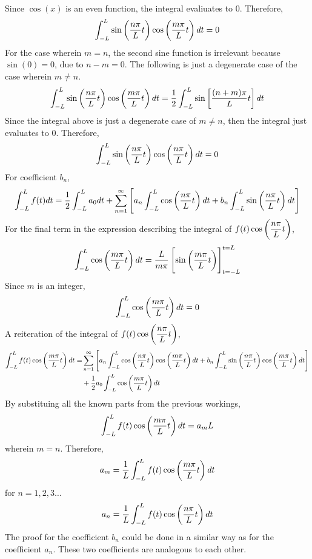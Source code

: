 \documentclass[a4paper, 12pt]{report}
\begin{document}
\begin{center}
\begin{align*}
\end{align*}
Since $\cos(x)$ is an even function, the integral evaliuates to 0. Therefore,
$$\int_{-L}^{L}\sin\left(\frac{n\pi}{L}t\right)\cos\left(\frac{m\pi}{L}t\right)dt = 0$$
For the case wherein $m = n$, the second sine function is irrelevant because $\sin(0) = 0$, due to $n-m=0$. The following is just a degenerate case of the case wherein $m\neq n$.
$$\int_{-L}^{L}\sin\left(\frac{n\pi}{L}t\right)\cos\left(\frac{m\pi}{L}t\right)dt = \frac{1}{2}\int_{-L}^{L}\sin\left[\frac{(n+m)\pi}{L}t\right]dt$$
Since the integral above is just a degenerate case of $m\neq n$, then the integral just evaluates to $0$. Therefore,
$$\int_{-L}^{L}\sin\left(\frac{n\pi}{L}t\right)\cos\left(\frac{n\pi}{L}t\right)dt = 0$$
For coefficient $b_n$,
$$\int_{-L}^{L}f(t)dt = \frac{1}{2} \int_{-L}^{L}a_0dt + \sum_{n = 1}^{\infty}\left[a_n \int_{-L}^{L}\cos\left(\frac{n\pi}{L}t\right)dt + b_n \int_{-L}^{L}\sin\left(\frac{n\pi}{L}t\right)dt\right]$$
For the final term in the expression describing the integral of $\displaystyle{f(t)\cos\left(\frac{n\pi}{L}t\right)}$, 
$$\int_{-L}^{L}\cos\left(\frac{m\pi}{L}t\right)dt = \frac{L}{m\pi}\left[\sin\left(\frac{m\pi}{L}t\right)\right]^{t=L}_{t=-L}$$
Since $m$ is an integer,
$$\int_{-L}^{L}\cos\left(\frac{m\pi}{L}t\right)dt = 0$$
A reiteration of the integral of $\displaystyle{f(t)\cos\left(\frac{n\pi}{L}t\right)}$,
 \begin{align*}
\int_{-L}^{L}f(t)\cos\left(\frac{m\pi}{L}t\right)dt = &\sum_{n = 1}^{\infty}\left[a_n \int_{-L}^{L}\cos\left(\frac{n\pi}{L}t\right)\cos\left(\frac{m\pi}{L}t\right)dt + b_n \int_{-L}^{L}\sin\left(\frac{n\pi}{L}t\right)\cos\left(\frac{m\pi}{L}t\right)dt\right] \\ &+ \frac{1}{2}a_0 \int_{-L}^{L}\cos\left(\frac{m\pi}{L}t\right)dt
\end{align*}
By substituing all the known parts from the previous workings, 
$$\int_{-L}^{L}f(t)\cos\left(\frac{m\pi}{L}t\right)dt = a_m L$$
wherein $m = n$. Therefore,
$$a_m = \frac{1}{L}\int_{-L}^{L}f(t)\cos\left(\frac{m\pi}{L}t\right)dt$$
for $n=1,2,3\dots$
$$a_n = \frac{1}{L}\int_{-L}^{L}f(t)\cos\left(\frac{n\pi}{L}t\right)dt$$
The proof for the coefficient $b_n$ could be done in a similar way as for the coefficient $a_n$. These two coefficients are analogous to each other.

\end{center}
\end{document}
